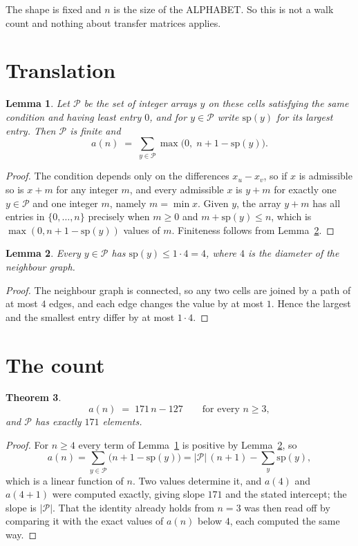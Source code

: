 \documentclass[11pt,a4paper]{article}
\theoremstyle{plain}
\newtheorem{theorem}{Theorem}
\newtheorem{lemma}[theorem]{Lemma}
\theoremstyle{definition}
\begin{document}
The shape is fixed and $n$ is the size of the ALPHABET. So this is not a walk count and
nothing about transfer matrices applies.

\section{Translation}

\begin{lemma}\label{lem:trans}
Let $\mathcal P$ be the set of integer arrays $y$ on these cells satisfying the same condition
and having least entry $0$, and for $y\in\mathcal P$ write $\mathrm{sp}(y)$ for its largest
entry. Then $\mathcal P$ is finite and
\[
a(n)\;=\;\sum_{y\in\mathcal P}\max\bigl(0,\;n+1-\mathrm{sp}(y)\bigr).
\]
\end{lemma}

\begin{proof}
The condition depends only on the differences $x_u-x_v$, so if $x$ is admissible so is $x+m$
for any integer $m$, and every admissible $x$ is $y+m$ for exactly one $y\in\mathcal P$ and one
integer $m$, namely $m=\min x$. Given $y$, the array $y+m$ has all entries in
$\{0,\dots,n\}$ precisely when $m\ge0$ and $m+\mathrm{sp}(y)\le n$, which is
$\max(0,n+1-\mathrm{sp}(y))$ values of $m$. Finiteness follows from
Lemma~\ref{lem:bound}.
\end{proof}

\begin{lemma}\label{lem:bound}
Every $y\in\mathcal P$ has $\mathrm{sp}(y)\le 1\cdot4=4$, where $4$ is the
diameter of the neighbour graph.
\end{lemma}

\begin{proof}
The neighbour graph is connected, so any two cells are joined by a path of at most $4$
edges, and each edge changes the value by at most $1$. Hence the largest and the smallest
entry differ by at most $1\cdot4$.
\end{proof}

\section{The count}

\begin{theorem}\label{thm:line}
\[
a(n)\;=\;171\,n-127\qquad\text{for every }n\ge3,
\]
and $\mathcal P$ has exactly $171$ elements.
\end{theorem}

\begin{proof}
For $n\ge4$ every term of Lemma~\ref{lem:trans} is positive by
Lemma~\ref{lem:bound}, so
\[
a(n)=\sum_{y\in\mathcal P}\bigl(n+1-\mathrm{sp}(y)\bigr)
=|\mathcal P|\,(n+1)-\sum_{y}\mathrm{sp}(y),
\]
which is a linear function of $n$. Two values determine it, and $a(4)$ and
$a(4+1)$ were computed exactly, giving slope $171$ and the stated intercept; the slope
is $|\mathcal P|$. That the identity already holds from $n=3$ was then read off by
comparing it with the exact values of $a(n)$ below $4$, each computed the same way.
\end{proof}
\end{document}
